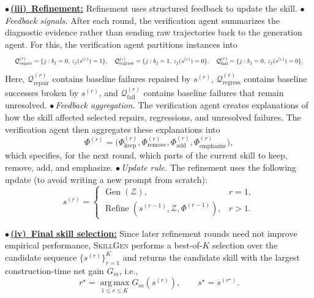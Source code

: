 \documentclass{article}
\begin{document}
$\bullet$\,\underline{\textbf{(iii)~Refinement:}} Refinement uses structured feedback to update the skill.
$\bullet$\,\emph{Feedback signals.}
After each round, the verification agent summarizes the diagnostic evidence rather than sending raw trajectories back to the generation agent. For this, the verification agent partitions instances into
\begin{equation}
\resizebox{0.98\columnwidth}{!}{$\displaystyle
\mathcal{Q}^{(r)}_{\mathrm{repair}}=\{j:b_j=0,\,z_j(s^{(r)})=1\},\quad
\mathcal{Q}^{(r)}_{\mathrm{regress}}=\{j:b_j=1,\,z_j(s^{(r)})=0\},\quad
\mathcal{Q}^{(r)}_{\mathrm{fail}}=\{j:b_j=0,\,z_j(s^{(r)})=0\},
$}
\end{equation}
Here, $\mathcal{Q}^{(r)}_{\mathrm{repair}}$ contains baseline failures repaired by $s^{(r)}$, $\mathcal{Q}^{(r)}_{\mathrm{regress}}$ contains baseline successes broken by $s^{(r)}$, and $\mathcal{Q}^{(r)}_{\mathrm{fail}}$ contains baseline failures that remain unresolved.
$\bullet$\,\emph{Feedback aggregation.}
The verification agent creates explanations of how the skill affected selected repairs, regressions, and unresolved failures. The verification agent then aggregates these explanations into
\begin{equation}
    \Phi^{(r)}=
    \big(\Phi^{(r)}_{\mathrm{keep}},
    \Phi^{(r)}_{\mathrm{remove}},
    \Phi^{(r)}_{\mathrm{add}},
    \Phi^{(r)}_{\mathrm{emphasize}}\big),
\end{equation}
which specifies, for the next round, which parts of the current skill to keep, remove, add, and emphasize.
$\bullet$\,\emph{Update rule.} The refinement uses the following update (to avoid writing a new prompt from scratch):
\begin{equation}
\label{eq:refine}
    s^{(r)}=
    \begin{cases}
        \operatorname{Gen}(\mathcal{Z}), & r=1,\\
        \operatorname{Refine}(s^{(r-1)},\mathcal{Z},\Phi^{(r-1)}), & r>1.
    \end{cases}
\end{equation}


$\bullet$\,\underline{\textbf{(iv)~Final skill selection:}} Since later refinement rounds need not improve empirical performance, \textsc{SkillGen} performs a best-of-$K$ selection over the candidate sequence $\{s^{(r)}\}_{r=1}^{K}$ and returns the candidate skill with the largest construction-time net gain $G_m$, i.e.,
\begin{equation}
    r^{\star}=\operatorname*{arg\,max}_{1\le r\le K}G_m(s^{(r)}),
    \qquad
    s^\star=s^{(r^\star)}.
\end{equation}
\end{document}
